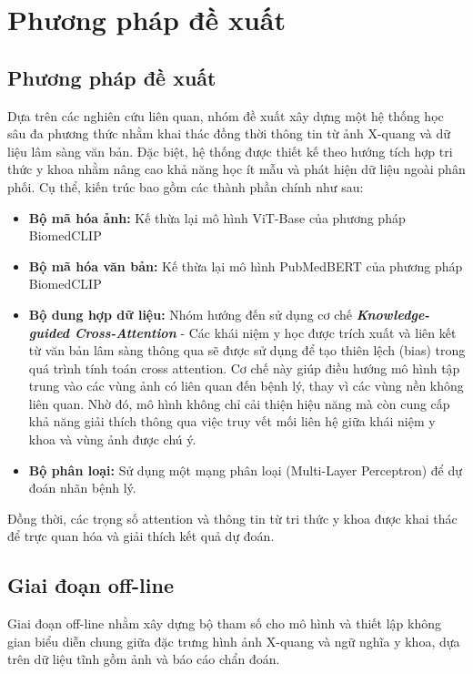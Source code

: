 \chapter{Phương pháp đề xuất}
\label{Chapter3}

\section{Phương pháp đề xuất} 

Dựa trên các nghiên cứu liên quan, nhóm đề xuất xây dựng một hệ thống học sâu đa phương thức nhằm khai thác đồng thời thông tin từ ảnh X-quang và dữ liệu lâm sàng văn bản. Đặc biệt, hệ thống được thiết kế theo hướng tích hợp tri thức y khoa nhằm nâng cao khả năng học ít mẫu và phát hiện dữ liệu ngoài phân phối. Cụ thể, kiến trúc bao gồm các thành phần chính như sau:
    \begin{itemize}
        \item \textbf{Bộ mã hóa ảnh:} Kế thừa lại mô hình ViT-Base của phương pháp BiomedCLIP \cite{BiomedCLIP}
        \item \textbf{Bộ mã hóa văn bản:} Kế thừa lại mô hình PubMedBERT của phương pháp BiomedCLIP \cite{BiomedCLIP}
        \item \textbf{Bộ dung hợp dữ liệu:} Nhóm hướng đến sử dụng cơ chế \textbf{\textit{Knowledge-guided Cross-Attention}} - Các khái niệm y học được trích xuất và liên kết từ văn bản lâm sàng thông qua sẽ được sử dụng để tạo thiên lệch (bias) trong quá trình tính toán cross attention. Cơ chế này giúp điều hướng mô hình tập trung vào các vùng ảnh có liên quan đến bệnh lý, thay vì các vùng nền không liên quan. Nhờ đó, mô hình không chỉ cải thiện hiệu năng mà còn cung cấp khả năng giải thích thông qua việc truy vết mối liên hệ giữa khái niệm y khoa và vùng ảnh được chú ý.
        \item \textbf{Bộ phân loại:} Sử dụng một mạng phân loại (Multi-Layer Perceptron) để dự đoán nhãn bệnh lý.
    \end{itemize}
    Đồng thời, các trọng số attention và thông tin từ tri thức y khoa được khai thác để trực quan hóa và giải thích kết quả dự đoán.

\section{Giai đoạn off-line}
Giai đoạn off-line nhằm xây dựng bộ tham số cho mô hình và thiết lập không gian biểu diễn chung giữa đặc trưng hình ảnh X-quang và ngữ nghĩa y khoa, dựa trên dữ liệu tĩnh gồm ảnh và báo cáo chẩn đoán.

